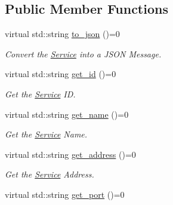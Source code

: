 \subsection*{Public Member Functions}
\begin{DoxyCompactItemize}
\item 
virtual std\-::string \hyperlink{classServiceInterface_a2c041d65d3e725f1cf8e2379f4620d58}{to\-\_\-json} ()=0
\begin{DoxyCompactList}\small\item\em Convert the \hyperlink{classService}{Service} into a J\-S\-O\-N Message. \end{DoxyCompactList}\item 
\hypertarget{classServiceInterface_a0ba731e4d379cbeddc852304b470c617}{virtual std\-::string \hyperlink{classServiceInterface_a0ba731e4d379cbeddc852304b470c617}{get\-\_\-id} ()=0}\label{classServiceInterface_a0ba731e4d379cbeddc852304b470c617}

\begin{DoxyCompactList}\small\item\em Get the \hyperlink{classService}{Service} I\-D. \end{DoxyCompactList}\item 
\hypertarget{classServiceInterface_aed2140959e23f98cd0cca1a101646384}{virtual std\-::string \hyperlink{classServiceInterface_aed2140959e23f98cd0cca1a101646384}{get\-\_\-name} ()=0}\label{classServiceInterface_aed2140959e23f98cd0cca1a101646384}

\begin{DoxyCompactList}\small\item\em Get the \hyperlink{classService}{Service} Name. \end{DoxyCompactList}\item 
\hypertarget{classServiceInterface_a6c4fd6eff9e1c8eed5dfed301d2f8047}{virtual std\-::string \hyperlink{classServiceInterface_a6c4fd6eff9e1c8eed5dfed301d2f8047}{get\-\_\-address} ()=0}\label{classServiceInterface_a6c4fd6eff9e1c8eed5dfed301d2f8047}

\begin{DoxyCompactList}\small\item\em Get the \hyperlink{classService}{Service} Address. \end{DoxyCompactList}\item 
\hypertarget{classServiceInterface_a7c8a328711f7fb019a9f7dadcb897cb0}{virtual std\-::string \hyperlink{classServiceInterface_a7c8a328711f7fb019a9f7dadcb897cb0}{get\-\_\-port} ()=0}\label{classServiceInterface_a7c8a328711f7fb019a9f7dadcb897cb0}


\end{DoxyCompactItemize}
